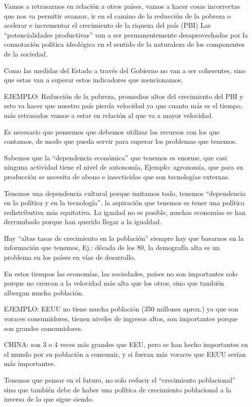 \documentclass[
  a4paper,
]{article}
\begin{document}
Vamos a retrasarnos en relación a otros países, vamos a hacer cosas
incorrectas que nos va permitir avanzar, ir en el camino de la reducción
de la pobreza o acelerar e incrementar el crecimiento de la riqueza del
país (PBI) Las ``potencialidades productivas'' van a ser permanentemente
desaprovechadas por la connotación política ideológica en el sentido de
la naturaleza de los componentes de la sociedad.

Como las medidas del Estado a través del Gobierno no van a ser
coherentes, sino que estas van a superar estos indicadores que
mencionamos.

EJEMPLO: Reducción de la pobreza, promedios altos del crecimiento del
PBI y esto va hacer que nuestro país pierda velocidad ya que cuanto más
es el tiempo, más retrasados vamos a estar en relación al que va a mayor
velocidad.

Es necesario que pensemos que debemos utilizar los recursos con los que
contamos, de modo que pueda servir para superar los problemas que
tenemos.

Sabemos que la ``dependencia económica'' que tenemos es enorme, que casi
ninguna actividad tiene el nivel de autonomía, Ejemplo: agronomía, que
para su producción se necesita de abono e insecticidas que son
tecnologías externas.

Tenemos una dependencia cultural porque imitamos todo, tenemos
``dependencia en la política y en la tecnología'', la aspiración que
tenemos es tener una política redistributiva más equitativa. La igualad
no es posible, muchas economías se han derrumbado porque han querido
llegar a la igualdad.

Hay ``altas tasas de crecimiento en la población'' siempre hay que
basarnos en la información que tenemos, Ej.: década de los 80, la
demografía alta es un problema en los países en vías de desarrollo.

En estos tiempos las economías, las sociedades, países no son
importantes solo porque no crezcan a la velocidad más alta que los
otros, sino que también albergan mucha población.

EJEMPLO: EEUU no tiene mucha población (350 millones aprox.) ya que son
voraces consumidores, tienen niveles de ingresos altos, son importantes
porque son grandes consumidores.

CHINA: son 3 o 4 veces más grandes que EEU, pero se han hecho
importantes en el mundo por su población a consumir, y si fueran más
voraces que EEUU serían más importantes.

Tenemos que pensar en el futuro, no solo reducir el ``crecimiento
poblacional'' sino que también debe de haber una política de crecimiento
poblacional a la inversa de lo que sigue siendo.
\end{document}
